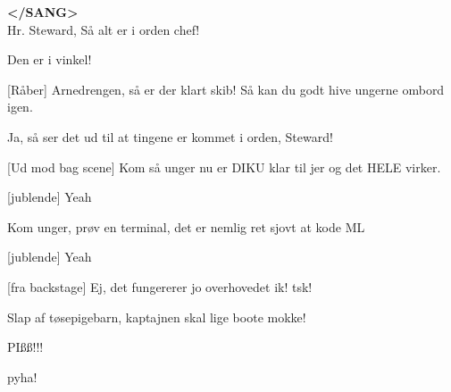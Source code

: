 \documentclass[a4paper,11pt]{article}
\begin{document}
\begin{sketch}

\large{\textbf{</SANG>}}\\

 Hr. Steward, Så alt er i orden chef!

  Den er i vinkel!


 [Råber] Arnedrengen, så er der klart skib! Så kan du godt
hive ungerne ombord igen.


 Ja, så ser det ud til at tingene er kommet i orden, Steward! 

 [Ud mod bag scene] Kom så unger nu er DIKU klar til jer og
det HELE virker. 


 [jublende] Yeah

 Kom unger, prøv en terminal, det er nemlig ret sjovt at kode
ML

 [jublende] Yeah

 [fra backstage] Ej, det fungererer jo overhovedet ik! tsk!

 Slap af tøsepigebarn, kaptajnen skal lige boote mokke!


 PIßß!!!


 pyha!

 
\end{sketch}
\end{document}
